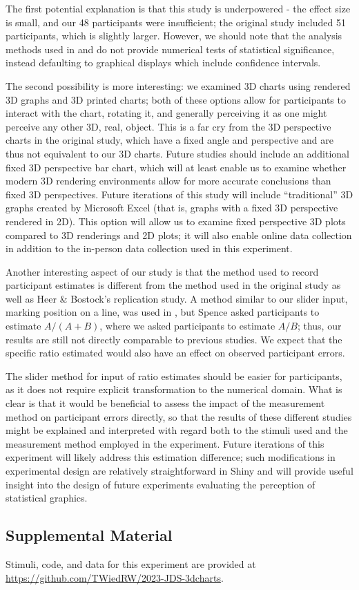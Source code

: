 \documentclass[letterpaper,inpress,dvipsnames]{jdsart}
\begin{document}
The first potential explanation is that this study is underpowered - the effect size is small, and our 48 participants were insufficient; the original study included 51 participants, which is slightly larger. However, we should note that the analysis methods used in \citet{heerCrowdsourcingGraphicalPerception2010b} and \citet{clevelandGraphical1984} do not provide numerical tests of statistical significance, instead defaulting to graphical displays which include confidence intervals.

The second possibility is more interesting: we examined 3D charts using rendered 3D graphs and 3D printed charts; both of these options allow for participants to interact with the chart, rotating it, and generally perceiving it as one might perceive any other 3D, real, object.
This is a far cry from the 3D perspective charts in the original study, which have a fixed angle and perspective and are thus not equivalent to our 3D charts.
Future studies should include an additional fixed 3D perspective bar chart, which will at least enable us to examine whether modern 3D rendering environments allow for more accurate conclusions than fixed 3D perspectives. Future iterations of this study will include ``traditional'' 3D graphs created by Microsoft Excel (that is, graphs with a fixed 3D perspective rendered in 2D). This option will allow us to examine fixed perspective 3D plots compared to 3D renderings and 2D plots; it will also enable online data collection in addition to the in-person data collection used in this experiment.

Another interesting aspect of our study is that the method used to record participant estimates is different from the method used in the original study as well as Heer \& Bostock's replication study.
A method similar to our slider input, marking position on a line, was used in \citet{spenceVisualPsychophysicsSimple1990}, but Spence asked participants to estimate \(A/(A+B)\), where we asked participants to estimate \(A/B\); thus, our results are still not directly comparable to previous studies.
We expect that the specific ratio estimated would also have an effect on observed participant errors.

The slider method for input of ratio estimates should be easier for participants, as it does not require explicit transformation to the numerical domain.
What is clear is that it would be beneficial to assess the impact of the measurement method on participant errors directly, so that the results of these different studies might be explained and interpreted with regard both to the stimuli used and the measurement method employed in the experiment.
Future iterations of this experiment will likely address this estimation difference; such modifications in experimental design are relatively straightforward in Shiny and will provide useful insight into the design of future experiments evaluating the perception of statistical graphics.

\hypertarget{supplemental-material}{%
\subsection{Supplemental Material}\label{supplemental-material}}

Stimuli, code, and data for this experiment are provided at \url{https://github.com/TWiedRW/2023-JDS-3dcharts}.



\end{document}
